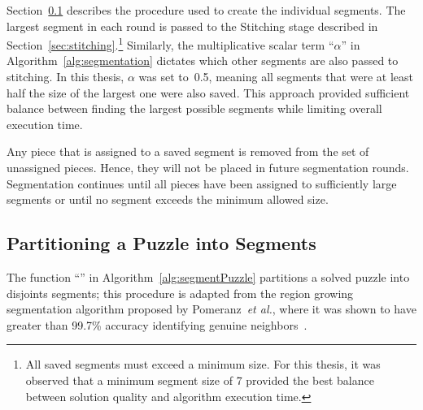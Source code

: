 Section~\ref{sec:segmentPuzzle} describes the procedure used to create the individual segments. The largest segment in each round is passed to the Stitching stage described in Section~\ref{sec:stitching}.\footnote{All saved segments must exceed a minimum size.  For this thesis, it was observed that a minimum segment size of 7 provided the best balance between solution quality and algorithm execution time.} Similarly, the multiplicative scalar term ``\textit{$\alpha$}'' in Algorithm~\ref{alg:segmentation} dictates which other segments are also passed to stitching.  In this thesis, \textit{$\alpha$} was set to~0.5, meaning all segments that were at least half the size of the largest one were also saved.  This approach provided sufficient balance between finding the largest possible segments while limiting overall execution time.

Any piece that is assigned to a saved segment is removed from the set of unassigned pieces.  Hence, they will not be placed in future segmentation rounds.  Segmentation continues until all pieces have been assigned to sufficiently large segments or until no segment exceeds the minimum allowed size.

\subsection{Partitioning a Puzzle into Segments}\label{sec:segmentPuzzle}

The function ``'' in Algorithm~\ref{alg:segmentPuzzle} partitions a solved puzzle into disjoints segments; this procedure is adapted from the region growing segmentation algorithm proposed by Pomeranz~\textit{et al.}, where it was shown to have greater than 99.7\% accuracy identifying genuine neighbors~\cite{pomeranz2011}. 

